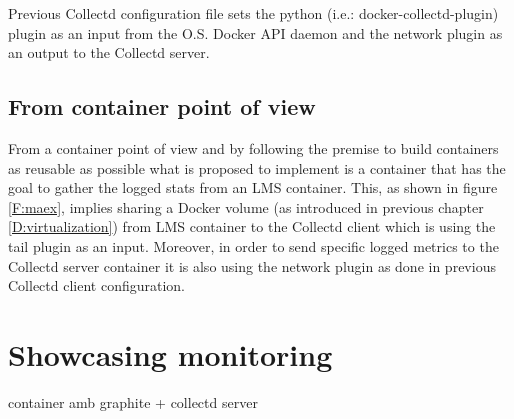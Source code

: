 Previous Collectd configuration file sets the python (i.e.: docker-collectd-plugin) plugin as an input from the O.S. Docker API daemon and the network plugin as an output to the Collectd server.

\subsection{From container point of view}

From a container point of view and by following the premise to build containers as reusable as possible what is proposed to implement is a container that has the goal to gather the logged stats from an LMS container. This, as shown in figure \ref{F:maex}, implies sharing a Docker volume (as introduced in previous chapter \ref{D:virtualization}) from LMS container to the Collectd client which is using the tail plugin as an input. Moreover, in order to send specific logged metrics to the Collectd server container it is also using the network plugin as done in previous Collectd client configuration.




\section{Showcasing monitoring}

container amb graphite + collectd server
